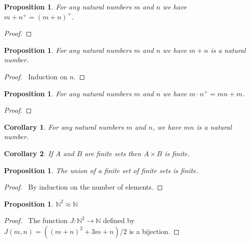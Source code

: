\documentclass{book}
\let\qed\relax
\newtheorem{prop}[ax]{Proposition}
\newtheorem{cor}{Corollary}[ax]
\theoremstyle{definition}
\begin{document}
\begin{prop}
For any natural numbers $m$ and $n$ we have $m + n^+ = (m+n)^+$.
\end{prop}

\begin{proof}
\pf
{}
\qed
\end{proof}

\begin{prop}
For any natural numbers $m$ and $n$ we have $m+n$ is a natural number.
\end{prop}

\begin{proof}
\pf\ Induction on $n$. \qed
\end{proof}

\begin{prop}
For any natural numbers $m$ and $n$ we have $m \cdot n^+ = mn + m$.
\end{prop}

\begin{proof}
\pf
{}
\qed
\end{proof}

\begin{cor}
For any natural numbers $m$ and $n$, we have $mn$ is a natural number.
\end{cor}

\begin{cor}
If $A$ and $B$ are finite sets then $A \times B$ is finite.
\end{cor}

\begin{prop}
The union of a finite set of finite sets is finite.
\end{prop}

\begin{proof}
\pf\ By induction on the number of elements. \qed
\end{proof}

\begin{prop}
$\mathbb{N}^2 \approx \mathbb{N}$
\end{prop}

\begin{proof}
\pf\ The function $J : \mathbb{N}^2 \rightarrow \mathbb{N}$ defined by $J(m,n) = ((m+n)^2 + 3m + n)/2$ is a bijection. \qed
\end{proof}
\end{document}
